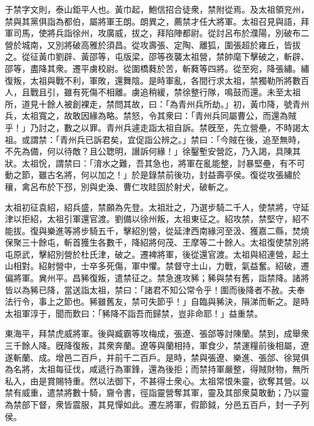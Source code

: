 \begin{pinyinscope}
 
 
 于禁字文則，泰山鉅平人也。黃巾起，鮑信招合徒衆，禁附從焉。及太祖領兖州，禁與其黨俱詣為都伯，屬將軍王朗。朗異之，薦禁才任大將軍。太祖召見與語，拜軍司馬，使將兵詣徐州，攻廣威，拔之，拜陷陣都尉。從討呂布於濮陽，別破布二營於城南，又別將破高雅於須昌。從攻壽張、定陶、離狐，圍張超於雍丘，皆拔之。從征黃巾劉辟、黃邵等，屯版梁，邵等夜襲太祖營，禁帥麾下擊破之，斬辟、邵等，盡降其衆。遷平虜校尉。從圍橋蕤於苦，斬蕤等四將。從至宛，降張繡。繡復叛，太祖與戰不利，軍敗，還舞陰。是時軍亂，各間行求太祖，禁獨勒所將數百人，且戰且引，雖有死傷不相離。虜追稍緩，禁徐整行隊，鳴鼓而還。未至太祖所，道見十餘人被創裸走，禁問其故，曰：「為青州兵所劫。」初，黃巾降，號青州兵，太祖寬之，故敢因緣為略。禁怒，令其衆曰：「青州兵同屬曹公，而還為賊乎！」乃討之，數之以罪。青州兵遽走詣太祖自訴。禁旣至，先立營壘，不時謁太祖。或謂禁：「青州兵已訴君矣，宜促詣公辨之。」禁曰：「今賊在後，追至無時，不先為備，何以待敵？且公聦明，譖訴何緣！」徐鑿塹安營訖，乃入謁，具陳其狀。太祖恱，謂禁曰：「淯水之難，吾其急也，將軍在亂能整，討暴堅壘，有不可動之節，雖古名將，何以加之！」於是錄禁前後功，封益壽亭侯。復從攻張繡於穰，禽呂布於下邳，別與史渙、曹仁攻眭固於射犬，破斬之。
 
 
 
 
 太祖初征袁紹，紹兵盛，禁願為先登。太祖壯之，乃選步騎二千人，使禁將，守延津以拒紹，太祖引軍還官渡。劉備以徐州叛，太祖東征之。紹攻禁，禁堅守，紹不能拔。復與樂進等將步騎五千，擊紹別營，從延津西南緣河至汲、獲嘉二縣，焚燒保聚三十餘屯，斬首獲生各數千，降紹將何茂、王摩等二十餘人。太祖復使禁別將屯原武，擊紹別營於杜氏津，破之。遷裨將軍，後從還官渡。太祖與紹連營，起土山相對。紹射營中，士卒多死傷，軍中懼。禁督守土山，力戰，氣益奮。紹破，遷偏將軍。兾州平。昌豨復叛，遣禁征之。禁急進攻豨；豨與禁有舊，詣禁降。諸將皆以為豨已降，當送詣太祖，禁曰：「諸君不知公常令乎！圍而後降者不赦。夫奉法行令，事上之節也。豨雖舊友，禁可失節乎！」自臨與豨決，隕涕而斬之。是時太祖軍淳于，聞而歎曰：「豨降不詣吾而歸禁，豈非命耶！」益重禁。
 
 
 東海平，拜禁虎威將軍。後與臧霸等攻梅成，張遼、張郃等討陳蘭。禁到，成舉衆三千餘人降。旣降復叛，其衆奔蘭。遼等與蘭相持，軍食少，禁運糧前後相屬，遼遂斬蘭、成。增邑二百戶，并前千二百戶。是時，禁與張遼、樂進、張郃、徐晃俱為名將，太祖每征伐，咸遞行為軍鋒，還為後拒；而禁持軍嚴整，得賊財物，無所私入，由是賞賜特重。然以法御下，不甚得士衆心。太祖常恨朱靈，欲奪其營。以禁有威重，遣禁將數十騎，齎令書，徑詣靈營奪其軍，靈及其部衆莫敢動；乃以靈為禁部下督，衆皆震服，其見憚如此。遷左將軍，假節鉞，分邑五百戶，封一子列侯。
 

\end{pinyinscope}
